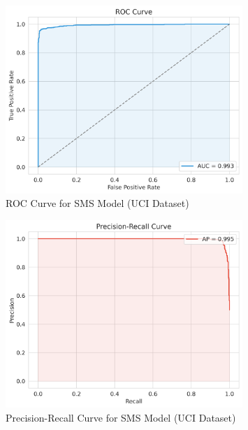 \documentclass{article}
\begin{document}
\begin{figure}[htbp]
    \centering
    \includegraphics[width=0.8\textwidth]{../analysis/sms/randomforest/uci/roc_curve.png}
    \caption{ROC Curve for SMS Model (UCI Dataset)}
    \label{fig:roc_curve_3}
\end{figure}

\begin{figure}[htbp]
    \centering
    \includegraphics[width=0.8\textwidth]{../analysis/sms/randomforest/uci/precision_recall_curve.png}
    \caption{Precision-Recall Curve for SMS Model (UCI Dataset)}
    \label{fig:precision_recall_curve_3}
\end{figure}
\end{document}

